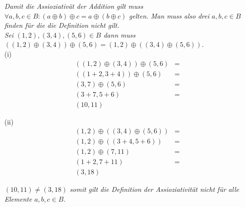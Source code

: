 \textit{Damit die Assioziativät der Addition gilt muss $\forall a,b,c \in B: (a \oplus b) \oplus c = a \oplus (b \oplus c)$ gelten. Man muss also drei $a,b,c \in B$ finden für die die Definition nicht gilt.}\\

\textit{Sei $(1,2), (3,4), (5,6) \in B$ dann muss $((1,2) \oplus (3,4)) \oplus (5,6) = (1,2) \oplus ((3,4) \oplus (5,6))$.}\\

(i)
\begin{align*}
((1,2) \oplus (3,4)) \oplus (5,6)&=\\
((1 + 2, 3 + 4)) \oplus (5,6)&=\\
(3, 7) \oplus (5,6)&=\\
(3 + 7, 5 + 6)&=\\
(10,11)
\end{align*}

(ii)
\begin{align*}
(1,2) \oplus ((3,4) \oplus (5,6))&=\\
(1,2) \oplus ((3 + 4, 5 + 6))&=\\
(1,2) \oplus (7, 11)&=\\
(1+2, 7+11)&=\\
(3, 18)
\end{align*}

\textit{$(10,11) \neq (3, 18)$ somit gilt die Definition der Assioziativität nicht für alle Elemente $a,b,c \in B$.}

\newpage